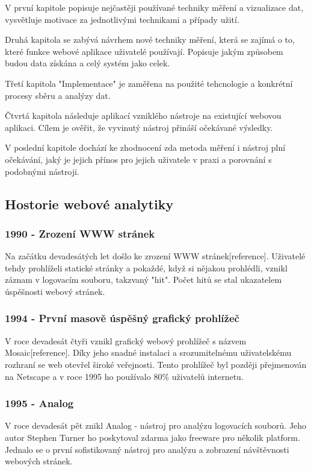 V první kapitole popisuje nejčastěji používané techniky měření a vizualizace dat, vysvětluje motivace za jednotlivými technikami a případy užití.

Druhá kapitola se zabývá návrhem nové techniky měření, která se zajímá o to, které funkce webové aplikace uživatelé používají. Popisuje jakým způsobem budou data získána a celý systém jako celek.

Třetí kapitola "Implementace" je zaměřena na použité tehcnologie a konkrétní procesy sběru a analýzy dat.

Čtvrtá kapitola následuje aplikací vzniklého nástroje na existující webovou aplikaci. Cílem je ověřit, že vyvinutý nástroj přináší očekávané výsledky.

V poslední kapitole dochází ke zhodnocení zda metoda měření i nástroj plní očekávání, jaký je jejich přínos pro jejich uživatele v praxi a porovnání s podobnými nástroji.








\subsection{Hostorie webové analytiky}

\subsubsection{1990 - Zrození WWW stránek}
Na začátku devadesátých let došlo ke zrození WWW stránek[reference]. Uživatelé tehdy prohlíželi statické stránky a pokaždé, když si nějakou prohlédli, vznikl záznam v logovacím souboru, takzvaný "hit". Počet hitů se stal ukazatelem úspěšnosti webový stránek.

\subsubsection{1994 - První masově úspěšný grafický prohlížeč}
V roce devadesát čtyři vznikl grafický webový prohlížeč s názvem Mosaic[reference]. Díky jeho snadné instalaci a srozumitelnému uživatelskému rozhraní se web otevřel široké veřejnosti. Tento prohlížeč byl později přejmenován na Netscape a v roce 1995 ho používalo 80\% uživatelů internetu.

\subsubsection{1995 - Analog}
V roce devadesát pět znikl Analog - nástroj pro analýzu logovacích souborů. Jeho autor Stephen Turner ho poskytoval zdarma jako freeware pro několik platform. Jednalo se o první sofistikovaný nástroj pro analýzu a zobrazení návštěvnosti webových stránek.




